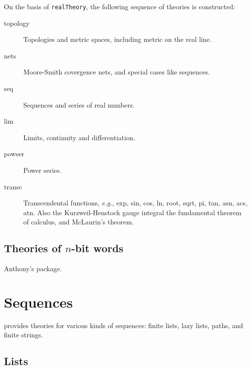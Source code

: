 On the basis of {\small\verb+realTheory+}, the following  sequence of
theories is constructed:

\begin{description}
\item [topology] Topologies and metric spaces, including metric on
the real line.
\item [nets] Moore-Smith covergence nets, and special cases like
sequences.
\item [seq] Sequences and series of real numbers.
\item [lim] Limits, continuity and differentiation.
\item [powser] Power series.
\item [transc] Transcendental functions, \emph{e.g.}, exp, sin,
cos, ln, root, sqrt, pi, tan, asn, acs, atn. Also the Kurzweil-Henstock
gauge integral the fundamental theorem of calculus, and McLaurin's
theorem.

\end{description}

\subsection{Theories of $n$-bit words}

Anthony's package.

\section{Sequences}

\HOL{} provides theories for various kinds of sequences: finite lists, lazy lists,
paths, and finite strings.

\subsection{Lists}\label{avra_list}

